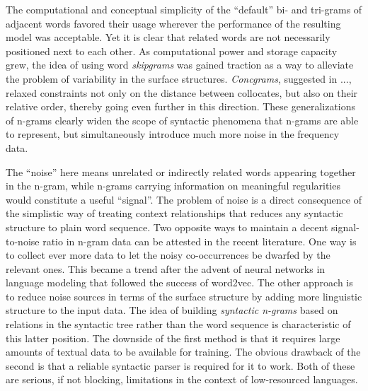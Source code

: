 \documentclass[12pt]{article}
\begin{document}
The computational and conceptual simplicity of the “default” bi- and
tri-grams of adjacent words favored their usage wherever the
performance of the resulting model was acceptable. Yet it is clear
that related words are not necessarily positioned next to each
other. As computational power and storage capacity grew, the idea of
using word \textit{skipgrams} was gained traction as a way to
alleviate the problem of variability in the surface
structures. \textit{Concgrams}, suggested in
..., relaxed constraints not only on the distance between
collocates, but also on their relative order, thereby going even further in this
direction. These generalizations of n-grams clearly widen the scope of
syntactic phenomena that n-grams are able to represent, but simultaneously
introduce much more noise in the frequency data.

The “noise” here means unrelated or indirectly related words appearing
together in the n-gram, while n-grams carrying information on
meaningful regularities would constitute a useful “signal”. The
problem of noise is a direct consequence of the simplistic way of
treating context relationships that reduces any syntactic structure to
plain word sequence. Two opposite ways to maintain a decent
signal-to-noise ratio in n-gram data can be attested in the recent
literature. One way is to collect ever more data to let the noisy
co-occurrences be dwarfed by the relevant ones. This became a trend
after the advent of neural networks in language modeling that followed
the success of word2vec. The other approach
is to reduce noise sources in terms of the surface structure by adding
more linguistic structure to the input data. The idea of building
\textit{syntactic n-grams} based on relations in the syntactic tree
rather than the word sequence is characteristic of this latter
position. The downside of the first method is
that it requires large amounts of textual data to be available for
training. The obvious drawback of the second is that a reliable
syntactic parser is required for it to work. Both of these are
serious, if not blocking, limitations in the context of low-resourced
languages.
\end{document}

